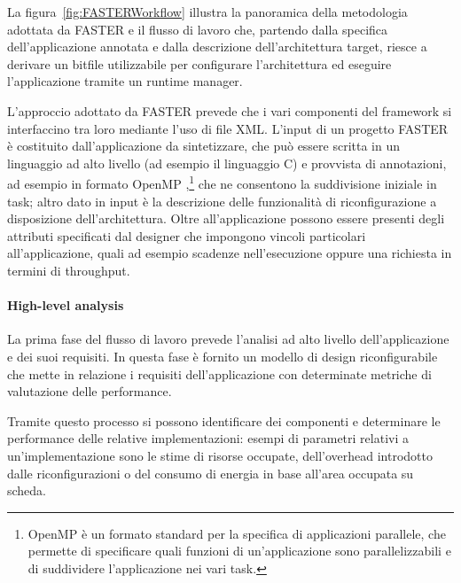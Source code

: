 La figura~\ref{fig:FASTERWorkflow} illustra la panoramica della metodologia 
adottata da \ac{FASTER} e il flusso di lavoro che, partendo dalla specifica 
dell'applicazione annotata e dalla descrizione dell'architettura target, riesce 
a derivare un bitfile utilizzabile per configurare l'architettura ed eseguire 
l'applicazione tramite un runtime manager.

L'approccio adottato da \ac{FASTER} prevede che i vari componenti del framework
si interfaccino tra loro mediante l'uso di file XML. L'input di un progetto
\ac{FASTER} è costituito dall'applicazione da sintetizzare, che può essere
scritta in un linguaggio ad alto livello (ad esempio il linguaggio C) e
provvista di annotazioni, ad esempio in formato OpenMP \cite{UsingOpenMP},\footnote{OpenMP è un
  formato standard per la specifica di applicazioni parallele, che permette di
  specificare quali funzioni di un'applicazione sono parallelizzabili e di
suddividere l'applicazione nei vari task.} che ne consentono la suddivisione
iniziale in task; altro dato in input \`e la descrizione delle funzionalità di
riconfigurazione a disposizione dell'architettura. Oltre all'applicazione
possono essere presenti degli attributi specificati dal designer che impongono
vincoli particolari all'applicazione, quali ad esempio scadenze nell'esecuzione
oppure una richiesta in termini di throughput.

\paragraph{High-level analysis}
La prima fase del flusso di lavoro prevede l'analisi ad alto livello 
dell'applicazione e dei suoi requisiti. In questa fase è fornito un modello di 
design riconfigurabile che mette in relazione i requisiti dell'applicazione con 
determinate metriche di valutazione delle performance.

Tramite questo processo si possono identificare dei componenti e determinare le 
performance delle relative implementazioni: esempi di parametri relativi a
un'implementazione sono le stime di risorse occupate, dell'overhead introdotto 
dalle riconfigurazioni o del consumo di energia in base all'area occupata su 
scheda.

